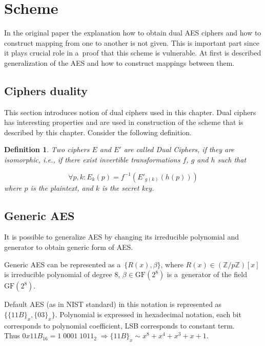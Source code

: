 \documentclass[11pt,oneside,final]{fithesis2}
\newtheorem{mydef}{Definition}
\newcommand{\gfe}{\ensuremath{\text{GF}\left(2^8\right)}}
\begin{document}
    
    \section{Scheme}

    In the original paper \citep{Karroumi:2010:PWA:2041036.2041060} the explanation how to obtain dual AES ciphers and how to construct mapping from one 
    to another is not given. This is
    important part since it plays crucial role in a~proof that this scheme is vulnerable. At first is described generalization of the AES and how to construct
    mappings between them. 

	\subsection{Ciphers duality}
	This section introduces notion of dual ciphers used in this chapter. Dual ciphers has interesting properties and are used in construction
	of the scheme that is described by this chapter. Consider the following definition.
	
	\begin{mydef}\label{def:dual_cipher}
	Two ciphers $E$ and $E'$ are called Dual Ciphers, if they are
	isomorphic, i.e., if there exist invertible transformations $f$, $g$ and $h$ such
	that

	\begin{equation} 
	\forall p, k: E_k(p) = f^{-1}\left(E'_{g(k)}(h(p))\right)
	\end{equation}
	where $p$ is the plaintext, and $k$ is the secret key.
	\end{mydef}

	\subsection{Generic AES}
	It is possible to generalize AES by changing its irreducible polynomial and generator to obtain generic form of AES.

	Generic AES can be represented as a~$\{R(x), \beta \}$, where $R(x) \in \left(\mathbb{Z}/p\mathbb{Z}\right)[x]$ is 
	irreducible polynomial of degree 8, $\beta \in \gfe$ is a~generator of the field $\gfe$.

	Default AES (as in NIST standard) in this notation is represented as $\{\{11B\}_x, \{03\}_x\}$. Polynomial is expressed
	in hexadecimal notation, each bit corresponds to polynomial coefficient, LSB corresponds to constant term.\\
	Thus $0x11B_{16} = 1 \; 0001 \; 1011_{2} \; \Rightarrow \{11B\}_x \sim x^8+x^4+x^3+x+1$.
\end{document}
